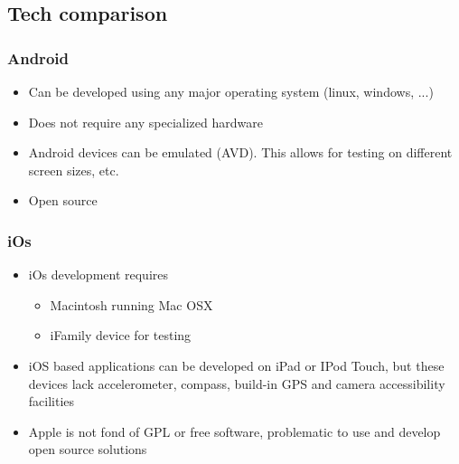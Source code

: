 \subsection{Tech comparison}

\subsubsection{Android}

	\begin{itemize}
		\item Can be developed using any major operating system (linux, windows, ...)
		\item Does not require any specialized hardware
		\item Android devices can be emulated (AVD). This allows for testing on
		different screen sizes, etc.
		\item Open source
	\end{itemize}

\subsubsection{iOs}

	\begin{itemize}
		\item iOs development requires
			\begin{itemize}
				\item Macintosh running Mac OSX
				\item iFamily device for testing
			\end{itemize}
		\item iOS based applications can be developed on iPad or IPod Touch, but
		these devices lack accelerometer, compass, build-in GPS and camera
		accessibility facilities
		\item Apple is not fond of GPL or free software, problematic to use and
		develop open source solutions 
	\end{itemize}


